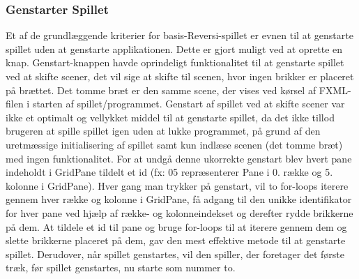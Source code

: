 \subsubsection{Genstarter Spillet} \label{gs}
Et af de grundlæggende kriterier for basis-Reversi-spillet er evnen til at genstarte spillet uden at genstarte applikationen. Dette er gjort muligt ved at oprette en knap. Genstart-knappen havde oprindeligt funktionalitet til at genstarte spillet ved at skifte scener, det vil sige at skifte til scenen, hvor ingen brikker er placeret på brættet. Det tomme bræt er den samme scene, der vises ved kørsel af FXML-filen i starten af spillet/programmet. Genstart af spillet ved at skifte scener var ikke et optimalt og vellykket middel til at genstarte spillet, da det ikke tillod brugeren at spille spillet igen uden at lukke programmet, på grund af den uretmæssige initialisering af spillet samt kun indlæse scenen (det tomme bræt) med ingen funktionalitet.\newline
For at undgå denne ukorrekte genstart blev hvert pane indeholdt i GridPane tildelt et id (fx: 05 repræsenterer Pane i 0. række og 5. kolonne i GridPane). Hver gang man trykker på genstart, vil to for-loops iterere gennem hver række og kolonne i GridPane, få adgang til den unikke identifikator for hver pane ved hjælp af række- og kolonneindekset og derefter rydde brikkerne på dem. At tildele et id til pane og bruge for-loops til at iterere gennem dem og slette brikkerne placeret på dem, gav den mest effektive metode til at genstarte spillet. Derudover, når spillet genstartes, vil den spiller, der foretager det første træk, før spillet genstartes, nu starte som nummer to.